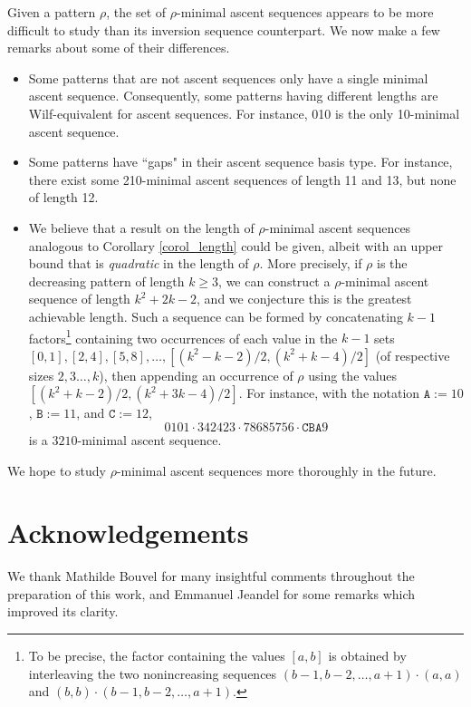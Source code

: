 \documentclass[a4paper,11pt]{article}
\theoremstyle{definition}
\theoremstyle{remark}
\begin{document}
\begin{itemize}
    Given a pattern $\rho$, the set of $\rho$-minimal ascent sequences appears to be more difficult to study than its inversion sequence counterpart. We now make a few remarks about some of their differences.
    \begin{itemize}
        \item Some patterns that are not ascent sequences only have a single minimal ascent sequence. Consequently, some patterns having different lengths are Wilf-equivalent for ascent sequences. For instance, 010 is the only 10-minimal ascent sequence.
        \item Some patterns have ``gaps" in their ascent sequence basis type. For instance, there exist some 210-minimal ascent sequences of length 11 and 13, but none of length 12.
        \item We believe that a result on the length of $\rho$-minimal ascent sequences analogous to Corollary \ref{corol_length} could be given, albeit with an upper bound that is \emph{quadratic} in the length of $\rho$. More precisely, if $\rho$ is the decreasing pattern of length $k \geq 3$, we can construct a $\rho$-minimal ascent sequence of length $k^2 + 2k - 2$, and we conjecture this is the greatest achievable length.
        Such a sequence can be formed by concatenating $k-1$ factors\footnote{To be precise, the factor containing the values $[a,b]$ is obtained by interleaving the two nonincreasing sequences $(b-1, b-2, \dots, a+1) \cdot (a, a)$ and $(b,b) \cdot (b-1, b-2, \dots, a+1)$.} containing two occurrences of each value in the $k-1$ sets $[0,1],[2,4], [5,8], \dots, [(k^2-k-2)/2, (k^2+k-4)/2]$ (of respective sizes $2,3 \dots, k$), then appending an occurrence of $\rho$ using the values $[(k^2+k-2)/2, (k^2+3k-4)/2]$.
        For instance, with the notation $\texttt A := 10$, $\texttt B := 11$, and $\texttt C := 12$,
        $$0101 \cdot 342423 \cdot 78685756 \cdot \texttt{CBA}9$$ is a $3210$-minimal ascent sequence.
    \end{itemize}
    We hope to study $\rho$-minimal ascent sequences more thoroughly in the future.
\end{itemize}

\section*{Acknowledgements}
We thank Mathilde Bouvel for many insightful comments throughout the preparation of this work, and Emmanuel Jeandel for some remarks which improved its clarity.
\end{document}
